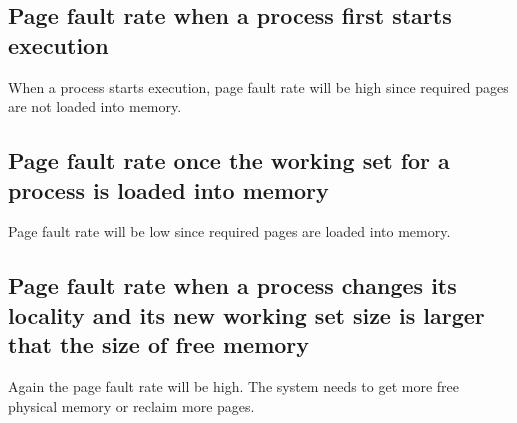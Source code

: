 \documentclass{article}
\begin{document}
\subsection{Page fault rate when a process first starts execution}
When a process starts execution, page fault rate will be high since required pages are not loaded into memory.
\subsection{Page fault rate once the working set for a process is loaded into memory}
Page fault rate will be low since required pages are loaded into memory.
\subsection{Page fault rate when a process changes its locality and its new working set size is larger that the size of free memory}
Again the page fault rate will be high. The system needs to get more free physical memory or reclaim more pages. 
\end{document}
